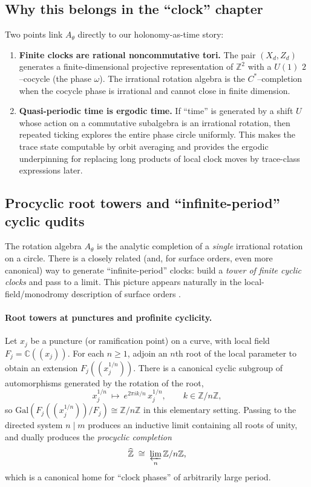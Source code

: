 \documentclass[11pt,oneside]{amsbook}
\numberwithin{equation}{section}
\theoremstyle{plain}
\theoremstyle{definition}
\theoremstyle{remark}
\newcommand{\Z}{\mathbb{Z}}
\newcommand{\C}{\mathbb{C}}
\begin{document}
\subsection{Why this belongs in the ``clock'' chapter}
Two points link $A_\theta$ directly to our holonomy-as-time story:

\begin{enumerate}
\item \textbf{Finite clocks are rational noncommutative tori.}
The pair $(X_d,Z_d)$ generates a finite-dimensional projective representation of $\Z^2$ with a $U(1)$ $2$--cocycle (the phase $\omega$).
The irrational rotation algebra is the $C^*$--completion when the cocycle phase is irrational and cannot close in finite dimension.

\item \textbf{Quasi-periodic time is ergodic time.}
If ``time'' is generated by a shift $U$ whose action on a commutative subalgebra is an irrational rotation,
then repeated ticking explores the entire phase circle uniformly.
This makes the trace state computable by orbit averaging and provides the ergodic underpinning for replacing long products of local clock moves by trace-class expressions later.
\end{enumerate}



\subsection{Procyclic root towers and ``infinite-period'' cyclic qudits}
\label{sec:procyclic_root_towers}

The rotation algebra $A_\theta$ is the analytic completion of a \emph{single} irrational rotation on a circle.
There is a closely related (and, for surface orders, even more canonical) way to generate ``infinite-period'' clocks:
build a \emph{tower of finite cyclic clocks} and pass to a limit.
This picture appears naturally in the local-field/monodromy description of surface orders \cite{Schreiber2018SurfaceAlgebrasII,Schreiber2018SurfaceAlgebrasI}.

\paragraph{Root towers at punctures and profinite cyclicity.}
Let $x_j$ be a puncture (or ramification point) on a curve, with local field $F_j=\C((x_j))$.
For each $n\ge 1$, adjoin an $n$th root of the local parameter to obtain an extension $F_j((x_j^{1/n}))$.
There is a canonical cyclic subgroup of automorphisms generated by the rotation of the root,
\[
x_j^{1/n}\ \longmapsto\ e^{2\pi i k/n}\,x_j^{1/n},
\qquad k\in\Z/n\Z,
\]
so $\mathrm{Gal}(F_j((x_j^{1/n}))/F_j)\cong \Z/n\Z$ in this elementary setting.
Passing to the directed system $n\mid m$ produces an inductive limit containing all roots of unity,
and dually produces the \emph{procyclic completion}
\[
\widehat{\Z}\;\cong\;\varprojlim_n \Z/n\Z,
\]
which is a canonical home for ``clock phases'' of arbitrarily large period.
\end{document}
